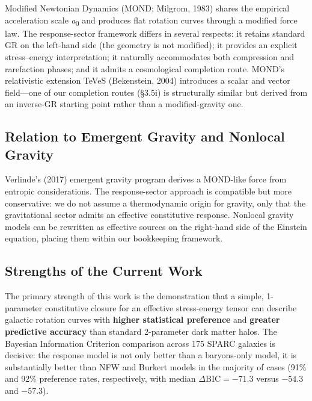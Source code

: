 \documentclass[11pt]{article}
\begin{document}
Modified Newtonian Dynamics (MOND; Milgrom, 1983) shares the empirical acceleration scale \emph{a}\textsubscript{0} and produces flat rotation curves through a modified force law. \citep{PoissonWill2014, Wald1984GR, Carroll2019} The response-sector framework differs in several respects: it retains standard GR on the left-hand side (the geometry is not modified); it provides an explicit stress--energy interpretation; it naturally accommodates both compression and rarefaction phases; and it admits a cosmological completion route. MOND's relativistic extension TeVeS (Bekenstein, 2004) introduces a scalar and vector field---one of our completion routes (§3.5i) is structurally similar but derived from an inverse-GR starting point rather than a modified-gravity one.

\subsection{Relation to Emergent Gravity and Nonlocal Gravity}\label{relation-to-emergent-gravity-and-nonlocal-gravity}

Verlinde's (2017) emergent gravity program derives a MOND-like force from entropic considerations. The response-sector approach is compatible but more conservative: we do not assume a thermodynamic origin for gravity, only that the gravitational sector admits an effective constitutive response. Nonlocal gravity models \citep{Deser2007, Rasanen2006} can be rewritten as effective sources on the right-hand side of the Einstein equation, placing them within our bookkeeping framework.

\subsection{Strengths of the Current Work}\label{strengths-of-the-current-work}

The primary strength of this work is the demonstration that a simple, 1-parameter constitutive closure for an effective stress-energy tensor can describe galactic rotation curves with \textbf{higher statistical preference} and \textbf{greater predictive accuracy} than standard 2-parameter dark matter halos. The Bayesian Information Criterion comparison across 175 SPARC galaxies is decisive: the response model is not only better than a baryons-only model, it is substantially better than NFW and Burkert models in the majority of cases (91\% and 92\% preference rates, respectively, with median \(\Delta\text{BIC} = -71.3\) versus \(-54.3\) and \(-57.3\)).
\end{document}
